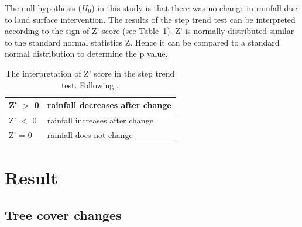 \documentclass[draft,linenumbers]{agujournal}
\begin{document}
\begin{article}

The null hypothesis ($H_0$) in this study is that there was no change in rainfall due to land surface intervention. The results of the step trend test can be interpreted according to the sign of Z' score (see Table~\ref{tab:Zscore}). Z' is normally distributed similar to the standard normal statistics Z. Hence it can be compared to a standard normal distribution to determine the p value. 

\begin{table}
  \caption[The interpretation of Z' score in the step trend test.]{The interpretation of Z' score in the step trend test. Following \citet[][Chapter 23, P887]{Hipel1994}.}
  \label{tab:Zscore}
  \centering
  \begin{tabular}{|l|l|} \hline
    Z' $>$ 0 & rainfall decreases after change\\ \hline
    Z' $<$ 0 & rainfall increases after change \\ \hline
    Z' = 0 & rainfall does not change \\ \hline
  \end{tabular}
\end{table}
  





\section{Result}

\subsection{Tree cover changes}


\end{article}
\end{document}
